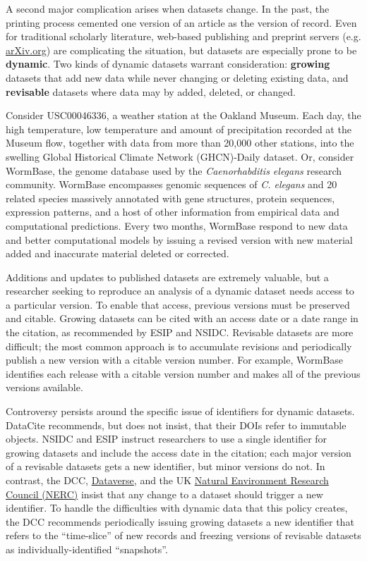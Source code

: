 \documentclass[10pt,a4paper,twocolumn]{article}
\begin{document}
{A second major complication arises when datasets change.
In the past, the printing process cemented one version of an article as the version of record.
Even for traditional scholarly literature, web-based publishing and preprint servers (e.g. \href{http://arxiv.org/}{arXiv.org}) are complicating the situation, but datasets are especially prone to be \textbf{dynamic}.
Two kinds of dynamic datasets warrant consideration: \textbf{growing} datasets that add new data while never changing or deleting existing data, and \textbf{revisable} datasets where data may by added, deleted, or changed.

Consider USC00046336, a weather station at the Oakland Museum.
Each day, the high temperature, low temperature and amount of precipitation recorded at the Museum \cite{global_historical_climate_data_network_daily_????} flow, together with data from more than 20,000 other stations, into the swelling Global Historical Climate Network (GHCN)-Daily\cite{menne_overview_2012} dataset.
Or, consider WormBase, the genome database used by the \textit{Caenorhabditis elegans} research community.
WormBase encompasses genomic sequences of \emph{C. elegans} and 20 related species massively annotated with gene structures, protein sequences, expression patterns, and a host of other information from empirical data and computational predictions.
Every two months, WormBase respond to new data and better computational models by issuing a revised version with new material added and inaccurate material deleted or corrected.

Additions and updates to published datasets are extremely valuable, but a researcher seeking to reproduce an analysis of a dynamic dataset needs access to a particular version.
To enable that access, previous versions must be preserved and citable.
Growing datasets can be cited with an access date or a date range in the citation, as recommended by ESIP and NSIDC.
Revisable datasets are more difficult; the most common approach is to accumulate revisions and periodically publish a new version with a citable version number.
For example, WormBase identifies each release with a citable version number and makes all of the previous versions available.

Controversy persists around the specific issue of identifiers for dynamic datasets. 
DataCite recommends, but does not insist, that their DOIs refer to immutable objects.
NSIDC and ESIP instruct researchers to use a single identifier for growing datasets and include the access date in the citation; each major version of a revisable datasets gets a new identifier, but minor versions do not.
In contrast, the DCC, \href{http://thedata.org/}{Dataverse}, and the UK \href{http://www.nerc.ac.uk/}{Natural Environment Research Council (NERC)} insist that any change to a dataset should trigger a new identifier\cite{ball_how_2012,altman_proposed_2007,sarah_callaghan_making_2012}.
To handle the difficulties with dynamic data that this policy creates, the DCC recommends periodically issuing growing datasets a new identifier that refers to the ``time-slice'' of new records and freezing versions of revisable datasets as individually-identified ``snapshots''.

}
\end{document}
